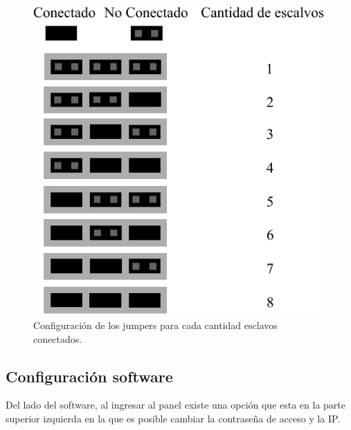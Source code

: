 \begin{figure}[ht!]
	\centering
	\includegraphics[width=0.6\linewidth]{imagenes/manual/jumper.pdf}
	\caption{Configuración de los jumpers para cada cantidad esclavos conectados.}
	\label{fig:manual-jumpers}
\end{figure}

\subsection{Configuración software}
Del lado del software, al ingresar al panel existe una opción que esta en la parte superior izquierda en la que es posible cambiar la contraseña de acceso y la IP.
